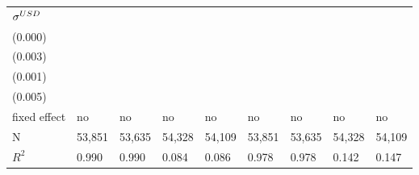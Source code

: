 \begin{tabular}{lllllllll}
${\it \sigma}^{USD}$  &                          \makecell{} &    \makecell{$-0.000^{}$ \\ (0.000)} &                          \makecell{} &  \makecell{$0.021^{***}$ \\ (0.003)} &                          \makecell{} &    \makecell{$-0.000^{}$ \\ (0.001)} &                          \makecell{} &  \makecell{$0.079^{***}$ \\ (0.005)} \\
\midrule fixed effect &                                   no &                                   no &                                   no &                                   no &                                   no &                                   no &                                   no &                                   no \\
N                     &                               53,851 &                               53,635 &                               54,328 &                               54,109 &                               53,851 &                               53,635 &                               54,328 &                               54,109 \\
$R^2$                 &                                0.990 &                                0.990 &                                0.084 &                                0.086 &                                0.978 &                                0.978 &                                0.142 &                                0.147 \\
\bottomrule
\end{tabular}
